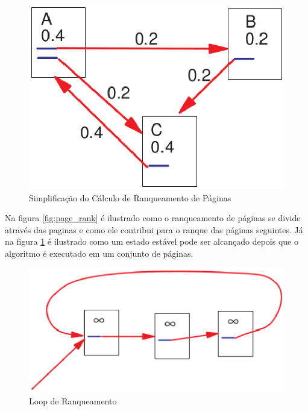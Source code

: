 \begin{figure}[!h]
    \centering
        \includegraphics[keepaspectratio=true,scale=0.5]{figuras/page_rank2.eps}
    \caption{Simplificação do Cálculo de Ranqueamento de Páginas}
    \label{fig:page_rank2}
\end{figure}

Na figura \ref{fig:page_rank} é ilustrado como o ranqueamento de páginas se divide através das paginas e como ele contribui para o ranque das páginas seguintes. Já na figura \ref{fig:page_rank2} é ilustrado como um estado estável pode ser alcançado depois que o algoritmo é executado em um conjunto de páginas. 



\begin{figure}[!h]
    \centering
        \includegraphics[keepaspectratio=true,scale=0.5]{figuras/page_rank3.eps}
    \caption{Loop de Ranqueamento}
    \label{fig:page_rank3}
\end{figure}

